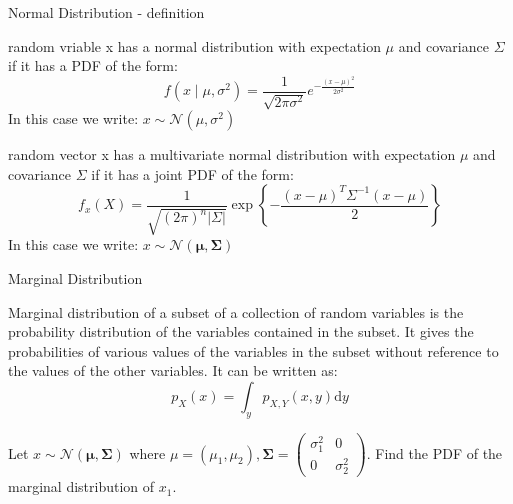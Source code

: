 \documentclass[11pt, usenames, dvipsnames]{beamer}
\begin{document}
\begin{frame}{Normal Distribution - definition}
\begin{definition}
random vriable x has a normal distribution with expectation $\mu$ and covariance $\Sigma$ if it has a PDF of the form:
$$f(x \mid \mu, \sigma^2) = \frac{1}{\sqrt{2\pi\sigma^2} } e^{ -\frac{(x-\mu)^2}{2\sigma^2} } $$
In this case we write: $x\sim\mathcal{N}({\mu},{\sigma^2})$

\end{definition}
\pause
\begin{definition}
random vector x has a multivariate normal distribution with expectation $\mu$ and covariance $\Sigma$ if it has a joint PDF of the form:
$$f_{x}\left(X\right)=\frac{1}{\sqrt{\left(2\pi\right)^{n}\left|\Sigma\right|}}\exp\left\{ -\frac{\left(x-\mu\right)^{T}\Sigma^{-1}\left(x-\mu\right)}{2}\right\} $$
In this case we write: $x\sim\mathcal{N}(\boldsymbol{\mu},\boldsymbol{\Sigma})$
\end{definition}
\end{frame}
\endgroup
\begin{frame}{Marginal Distribution}

\begin{definition}
Marginal distribution of a subset of a collection of random variables is the probability distribution of the variables contained in the subset. It gives the probabilities of various values of the variables in the subset without reference to the values of the other variables. It can be written as:
$$p_{X}(x)=\int_{y}p_{X,Y}(x,y)\mathrm{d}y$$
\end{definition}
\pause
\begin{exercise}
Let $x\sim\mathcal{N}(\boldsymbol{\mu},\boldsymbol{\Sigma})$ where $\mu = (\mu_1, \mu_2), \boldsymbol{\Sigma}=\left(\begin{array}{cc}
\sigma_{1}^{2} & 0\\
0 & \sigma_{2}^{2}
\end{array}\right)$.
Find the PDF of the marginal distribution of $x_1$.
\end{exercise}
\end{frame}

\begingroup
\footnotesize%
\end{document}
